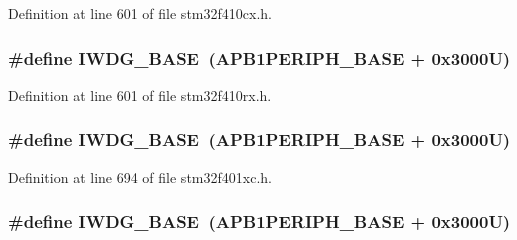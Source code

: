 Definition at line 601 of file stm32f410cx.\+h.

\subsubsection[{\texorpdfstring{I\+W\+D\+G\+\_\+\+B\+A\+SE}{IWDG_BASE}}]{\setlength{\rightskip}{0pt plus 5cm}\#define I\+W\+D\+G\+\_\+\+B\+A\+SE~({\bf A\+P\+B1\+P\+E\+R\+I\+P\+H\+\_\+\+B\+A\+SE} + 0x3000\+U)}\hypertarget{group___peripheral__registers__structures_ga8543ee4997296af5536b007cd4748f55}{}\label{group___peripheral__registers__structures_ga8543ee4997296af5536b007cd4748f55}


Definition at line 601 of file stm32f410rx.\+h.

\subsubsection[{\texorpdfstring{I\+W\+D\+G\+\_\+\+B\+A\+SE}{IWDG_BASE}}]{\setlength{\rightskip}{0pt plus 5cm}\#define I\+W\+D\+G\+\_\+\+B\+A\+SE~({\bf A\+P\+B1\+P\+E\+R\+I\+P\+H\+\_\+\+B\+A\+SE} + 0x3000\+U)}\hypertarget{group___peripheral__registers__structures_ga8543ee4997296af5536b007cd4748f55}{}\label{group___peripheral__registers__structures_ga8543ee4997296af5536b007cd4748f55}


Definition at line 694 of file stm32f401xc.\+h.

\subsubsection[{\texorpdfstring{I\+W\+D\+G\+\_\+\+B\+A\+SE}{IWDG_BASE}}]{\setlength{\rightskip}{0pt plus 5cm}\#define I\+W\+D\+G\+\_\+\+B\+A\+SE~({\bf A\+P\+B1\+P\+E\+R\+I\+P\+H\+\_\+\+B\+A\+SE} + 0x3000\+U)}\hypertarget{group___peripheral__registers__structures_ga8543ee4997296af5536b007cd4748f55}{}\label{group___peripheral__registers__structures_ga8543ee4997296af5536b007cd4748f55}


